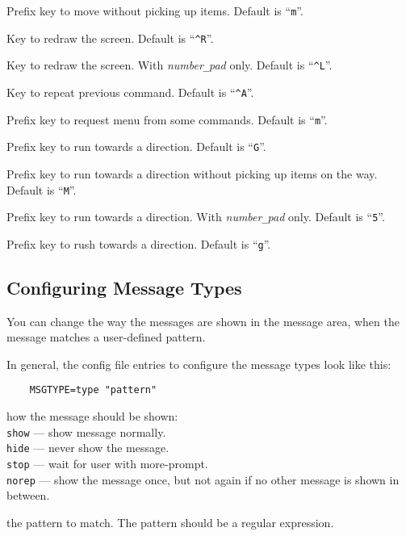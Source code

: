 \item{}
Prefix key to move without picking up items. Default is ``{\tt m}''.
\item{}
Key to redraw the screen. Default is ``{\tt \^{}R}''.
\item{}
Key to redraw the screen. With {\it number\verb+_+pad\/} only. Default is ``{\tt \^{}L}''.
\item{}
Key to repeat previous command. Default is ``{\tt \^{}A}''.
\item{}
Prefix key to request menu from some commands. Default is ``{\tt m}''.
\item{}
Prefix key to run towards a direction. Default is ``{\tt G}''.
\item{}
Prefix key to run towards a direction without picking up items on the way. Default is ``{\tt M}''.
\item{}
Prefix key to run towards a direction. With {\it number\verb+_+pad\/} only. Default is ``{\tt 5}''.
\item{}
Prefix key to rush towards a direction. Default is ``{\tt g}''.
\elist
\elist


\subsection*{Configuring Message Types}

You can change the way the messages are shown in the message area, when
the message matches a user-defined pattern.

In general, the config file entries to configure the message types
look like this:
\begin{verbatim}
    MSGTYPE=type "pattern"
\end{verbatim}
\blist{}
\item[\ib{type}]
how the message should be shown:
\\
{\tt show}  --- show message normally.\\
{\tt hide}  --- never show the message.\\
{\tt stop}  --- wait for user with more-prompt.\\
{\tt norep} --- show the message once, but not again if no other message is shown in between.
\item[\ib{pattern}]
the pattern to match. The pattern should be a regular expression.
\elist

